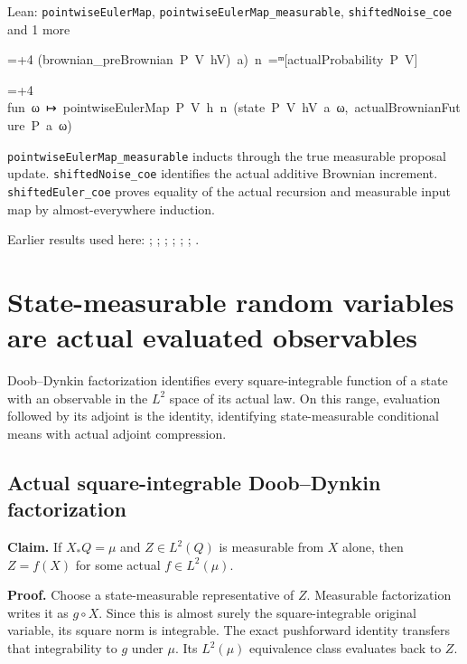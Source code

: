 \documentclass[11pt,a4paper]{report}
\newlength{\leancharwidth}
\newenvironment{leancode}{\par\smallskip\begingroup\ttfamily\footnotesize\raggedright
  \settowidth{\leancharwidth}{M}\setlength{\parskip}{0pt}\setlength{\parindent}{0pt}
  \frenchspacing}{\par\endgroup\smallskip}
\newcommand{\leanline}[2]{\hangindent=\dimexpr#1\leancharwidth+4\leancharwidth\relax
  \hangafter=1\noindent\hspace*{#1\leancharwidth}#2\par}
\newcommand{\leanlabel}[1]{\par\smallskip\noindent{\small\bfseries #1}\par}
\begin{document}
\begin{leanbox}{Lean: \texttt{pointwiseEulerMap}, \texttt{pointwiseEulerMap\_\allowbreak{}measurable}, \texttt{shiftedNoise\_\allowbreak{}coe} and 1 more}
\begin{leancode}
\leanline{8}{(brownian\_preBrownian\ P\ V\ hV)\ a)\ n\ =ᵐ[actualProbability\ P\ V]}
\leanline{6}{fun\ ω\ ↦\ pointwiseEulerMap\ P\ V\ h\ n\ (state\ P\ V\ hV\ a\ ω,\ actualBrownianFuture\ P\ a\ ω)}
\end{leancode}
\leanlabel{How the Lean proof follows the argument}
\texttt{pointwise\allowbreak{}Euler\allowbreak{}Map\_\allowbreak{}measurable} inducts through the true measurable proposal update. \texttt{shifted\allowbreak{}Noise\_\allowbreak{}coe} identifies the actual additive Brownian increment. \texttt{shifted\allowbreak{}Euler\_\allowbreak{}coe} proves equality of the actual recursion and measurable input map by almost-everywhere induction.
\end{leanbox}


Earlier results used here: \cite[Section~3.13.2]{LangevinLean2026ULASC}; \cite[Section~3.13.3]{LangevinLean2026ULASC}; \cite[Section~3.16.1]{LangevinLean2026ULASC}; \cite[Section~3.24.14]{LangevinLean2026ULASC}; \cite[Section~3.24.15]{LangevinLean2026ULASC}; \cite[Section~3.24.21]{LangevinLean2026ULASC}; \cite[Section~3.25.1]{LangevinLean2026ULASC}.
\section{\texorpdfstring{State-measurable random variables are actual evaluated observables}{State-measurable random variables are actual evaluated observables}}
\label{proof-module-WassersteinMixing-ObservableRange-lean}


Doob–Dynkin factorization identifies every square-integrable function of a state with an observable in the \(L^2\) space of its actual law. On this range, evaluation followed by its adjoint is the identity, identifying state-measurable conditional means with actual adjoint compression.

\subsection{\texorpdfstring{Actual square-integrable Doob–Dynkin factorization}{Actual square-integrable Doob–Dynkin factorization}}
\label{report-step-WassersteinMixing-ObservableRange-lean-1}


\textbf{Claim.} If \(X_*Q=\mu\) and \(Z\in L^2(Q)\) is measurable from \(X\) alone, then \(Z=f(X)\) for some actual \(f\in L^2(\mu)\).



\textbf{Proof.} Choose a state-measurable representative of \(Z\). Measurable factorization writes it as \(g\circ X\). Since this is almost surely the square-integrable original variable, its square norm is integrable. The exact pushforward identity transfers that integrability to \(g\) under \(\mu\). Its \(L^2(\mu)\) equivalence class evaluates back to \(Z\).
\end{document}
